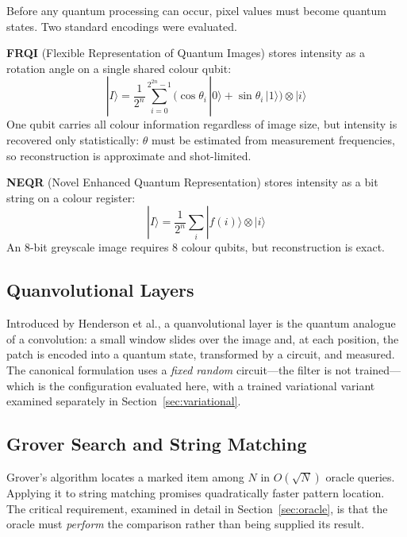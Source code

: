 \documentclass[11pt,a4paper]{article}
\begin{document}
Before any quantum processing can occur, pixel values must become quantum states.
Two standard encodings were evaluated.

\textbf{FRQI} (Flexible Representation of Quantum Images) stores intensity as a
rotation angle on a single shared colour qubit:
\begin{equation}
|I\rangle = \frac{1}{2^{n}}\sum_{i=0}^{2^{2n}-1}
\big(\cos\theta_i\,|0\rangle + \sin\theta_i\,|1\rangle\big)\otimes|i\rangle
\end{equation}
One qubit carries all colour information regardless of image size, but intensity
is recovered only statistically: $\theta$ must be estimated from measurement
frequencies, so reconstruction is approximate and shot-limited.

\textbf{NEQR} (Novel Enhanced Quantum Representation) stores intensity as a bit
string on a colour register:
\begin{equation}
|I\rangle = \frac{1}{2^{n}}\sum_{i}|f(i)\rangle\otimes|i\rangle
\end{equation}
An 8-bit greyscale image requires 8 colour qubits, but reconstruction is exact.

\subsection{Quanvolutional Layers}

Introduced by Henderson et al., a quanvolutional layer is the quantum analogue of
a convolution: a small window slides over the image and, at each position, the
patch is encoded into a quantum state, transformed by a circuit, and measured.
The canonical formulation uses a \emph{fixed random} circuit---the filter is not
trained---which is the configuration evaluated here, with a trained variational
variant examined separately in Section~\ref{sec:variational}.

\subsection{Grover Search and String Matching}

Grover's algorithm locates a marked item among $N$ in $O(\sqrt{N})$ oracle
queries. Applying it to string matching promises quadratically faster pattern
location. The critical requirement, examined in detail in
Section~\ref{sec:oracle}, is that the oracle must \emph{perform} the comparison
rather than being supplied its result.

\end{document}
